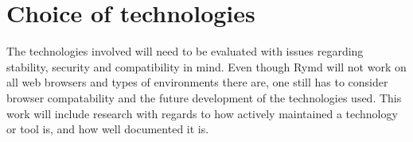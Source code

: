 \section{Choice of technologies}
The technologies involved will need to be evaluated with issues regarding stability, security and compatibility in mind. Even though Rymd will not work on all web browsers and types of environments there are, one still has to consider browser compatability and the future development of the technologies used. This work will include research with regards to how actively maintained a technology or tool is, and how well documented it is. 
























